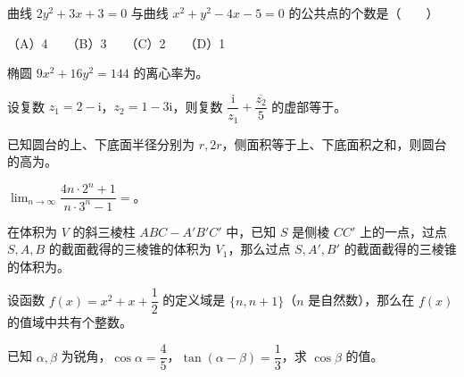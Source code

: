 \begin{question}

曲线 $2y^2+3x+3=0$ 与曲线 $x^2+y^2-4x-5=0$ 的公共点的个数是\mbox{（　　）}

（A）4　　（B）3　　（C）2　　（D）1

\end{question}
\begin{question}

椭圆 $9x^2+16y^2=144$ 的离心率为\underline{\hspace{6em}}。

\end{question}
\begin{question}

设复数 $z_1=2-\mathrm i$，$z_2=1-3\mathrm i$，则复数 $\dfrac{\mathrm i}{z_1}+\dfrac{\overline{z_2}}5$ 的虚部等于\underline{\hspace{6em}}。

\end{question}
\begin{question}

已知圆台的上、下底面半径分别为 $r,2r$，侧面积等于上、下底面积之和，则圆台的高为\underline{\hspace{6em}}。

\end{question}
\begin{question}

$\displaystyle\lim_{n\to\infty}\dfrac{4n\cdot2^n+1}{n\cdot3^n-1}=$\underline{\hspace{6em}}。

\end{question}
\begin{question}

在体积为 $V$ 的斜三棱柱 $ABC-A'B'C'$ 中，已知 $S$ 是侧棱 $CC'$ 上的一点，过点 $S,A,B$ 的截面截得的三棱锥的体积为 $V_1$，那么过点 $S,A',B'$ 的截面截得的三棱锥的体积为\underline{\hspace{6em}}。

\end{question}
\begin{question}

设函数 $f(x)=x^2+x+\dfrac12$ 的定义域是 $\{n,n+1\}$（$n$ 是自然数），那么在 $f(x)$ 的值域中共有\underline{\hspace{4em}}个整数。

\end{question}
\begin{question}

已知 $\alpha,\beta$ 为锐角，$\cos\alpha=\dfrac45$，$\tan(\alpha-\beta)=\dfrac13$，求 $\cos\beta$ 的值。

\end{question}
